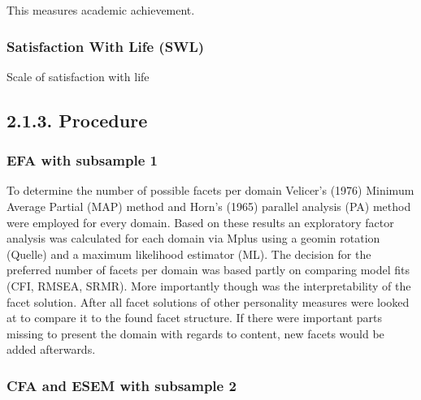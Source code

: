 \documentclass[floatsintext,man]{apa6}
\theoremstyle{definition}
\theoremstyle{definition}
\theoremstyle{definition}
\theoremstyle{remark}
\begin{document}
This measures academic achievement.

\hypertarget{satisfaction-with-life-swl}{%
\subsubsection{Satisfaction With Life
(SWL)}\label{satisfaction-with-life-swl}}

Scale of satisfaction with life

\hypertarget{procedure}{%
\subsection{2.1.3. Procedure}\label{procedure}}

\hypertarget{efa-with-subsample-1}{%
\subsubsection{EFA with subsample 1}\label{efa-with-subsample-1}}

To determine the number of possible facets per domain Velicer's (1976)
Minimum Average Partial (MAP) method and Horn's (1965) parallel analysis
(PA) method were employed for every domain. Based on these results an
exploratory factor analysis was calculated for each domain via Mplus
using a geomin rotation (Quelle) and a maximum likelihood estimator
(ML). The decision for the preferred number of facets per domain was
based partly on comparing model fits (CFI, RMSEA, SRMR). More
importantly though was the interpretability of the facet solution. After
all facet solutions of other personality measures were looked at to
compare it to the found facet structure. If there were important parts
missing to present the domain with regards to content, new facets would
be added afterwards.

\hypertarget{cfa-and-esem-with-subsample-2}{%
\subsubsection{CFA and ESEM with subsample
2}\label{cfa-and-esem-with-subsample-2}}
\end{document}
